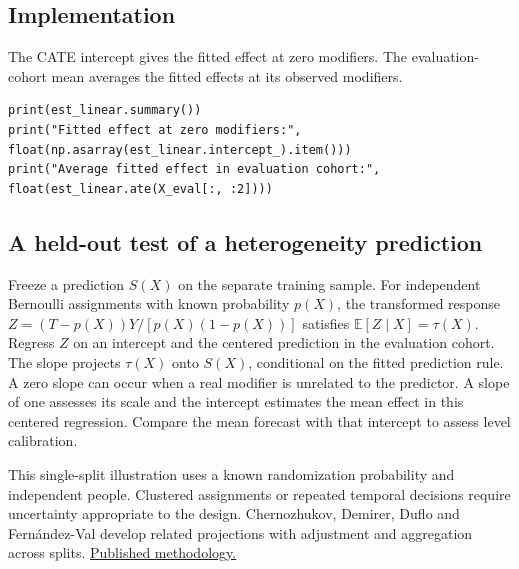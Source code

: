 \subsection{Implementation}

The CATE intercept gives the fitted effect at zero modifiers. The evaluation-cohort mean averages the fitted effects at its observed modifiers.

\begin{verbatim}
print(est_linear.summary())
print("Fitted effect at zero modifiers:", float(np.asarray(est_linear.intercept_).item()))
print("Average fitted effect in evaluation cohort:", float(est_linear.ate(X_eval[:, :2])))
\end{verbatim}

\subsection{A held-out test of a heterogeneity prediction}

Freeze a prediction $S(X)$ on the separate training sample. For independent Bernoulli assignments with known probability $p(X)$, the transformed response $Z=(T-p(X))Y/[p(X)(1-p(X))]$ satisfies $\mathbb{E}[Z\mid X]=\tau(X)$. Regress $Z$ on an intercept and the centered prediction in the evaluation cohort. The slope projects $\tau(X)$ onto $S(X)$, conditional on the fitted prediction rule. A zero slope can occur when a real modifier is unrelated to the predictor. A slope of one assesses its scale and the intercept estimates the mean effect in this centered regression. Compare the mean forecast with that intercept to assess level calibration.

This single-split illustration uses a known randomization probability and independent people. Clustered assignments or repeated temporal decisions require uncertainty appropriate to the design. Chernozhukov, Demirer, Duflo and Fern\'andez-Val develop related projections with adjustment and aggregation across splits. \href{https://doi.org/10.3982/ECTA19303}{Published methodology.}

